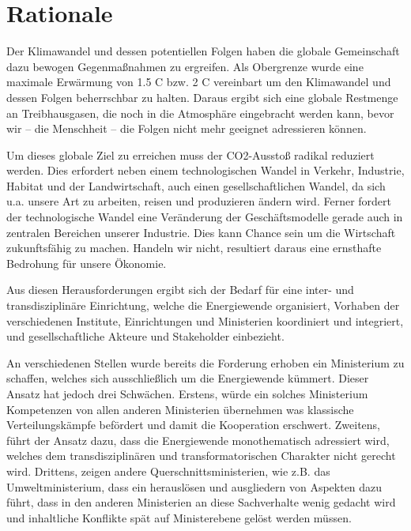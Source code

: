 \section{Rationale}

Der Klimawandel und dessen potentiellen Folgen haben die globale Gemeinschaft dazu bewogen Gegenmaßnahmen zu ergreifen. Als Obergrenze wurde eine maximale Erwärmung von 1.5 \degree{}C bzw. 2 \degree{}C vereinbart um den Klimawandel und dessen Folgen beherrschbar zu halten.
Daraus ergibt sich eine globale Restmenge an Treibhausgasen, die noch in die Atmosphäre eingebracht werden kann, bevor wir -- die Menschheit -- die Folgen nicht mehr geeignet adressieren können.

Um dieses globale Ziel zu erreichen muss der CO2-Ausstoß radikal reduziert werden.
Dies erfordert neben einem technologischen Wandel in Verkehr, Industrie, Habitat und der Landwirtschaft, auch einen gesellschaftlichen Wandel, da sich u.a. unsere Art zu arbeiten, reisen und produzieren ändern wird.
Ferner fordert der technologische Wandel eine Veränderung der Geschäfts\-modelle gerade auch in zentralen Bereichen unserer Industrie.
Dies kann Chance sein um die Wirtschaft zukunftsfähig zu machen.
Handeln wir nicht, resultiert daraus eine ernsthafte Bedrohung für unsere Ökonomie.

Aus diesen Herausforderungen ergibt sich der Bedarf für eine inter- und transdisziplinäre Einrichtung, welche die Energiewende organisiert, Vorhaben der verschiedenen Institute, Einrichtungen und Ministerien koordiniert und integriert, und gesellschaftliche Akteure und Stakeholder einbezieht.

An verschiedenen Stellen wurde bereits die Forderung erhoben ein Ministerium zu schaffen, welches sich ausschließlich um die Energiewende kümmert.
Dieser Ansatz hat jedoch drei Schwächen.
Erstens, würde ein solches Ministerium Kompetenzen von allen anderen Ministerien übernehmen was klassische Verteilungskämpfe befördert und damit die Kooperation erschwert.
Zweitens, führt der Ansatz dazu, dass die Energiewende monothematisch adressiert wird, welches dem transdisziplinären und transformatorischen Charakter nicht gerecht wird.
Drittens, zeigen andere Querschnittsministerien, wie z.B. das Umweltministerium, dass ein herauslösen und ausgliedern von Aspekten dazu führt, dass in den anderen Ministerien an diese Sachverhalte wenig gedacht wird und inhaltliche Konflikte spät auf Ministerebene gelöst werden müssen.

